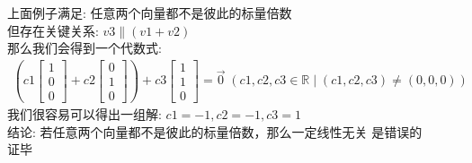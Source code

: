 \documentclass[12pt]{article}
\begin{document}
\begin{flushleft}
    上面例子满足: 任意两个向量都不是彼此的标量倍数 \\
    但存在关键关系: $v3 \parallel (v1 + v2)$ \\
    那么我们会得到一个代数式:
    \begin{align}
        (c1\begin{bmatrix}
               1 \\
               0 \\
               0
           \end{bmatrix} + c2\begin{bmatrix}
                                 0 \\
                                 1 \\
                                 0
                             \end{bmatrix}) + c3\begin{bmatrix}
                                                    1 \\
                                                    1 \\
                                                    0
                                                \end{bmatrix} = \vec{0} \; ({c1,c2,c3 \in \mathbb{R}  \mid (c1,c2,c3) \neq (0, 0, 0)})
    \end{align}
    我们很容易可以得出一组解: $c1 = -1 , c2 = -1 , c3 = 1$ \\
    结论: 若任意两个向量都不是彼此的标量倍数，那么一定线性无关 是错误的 \\
    证毕 \\
\end{flushleft}
\end{document}
